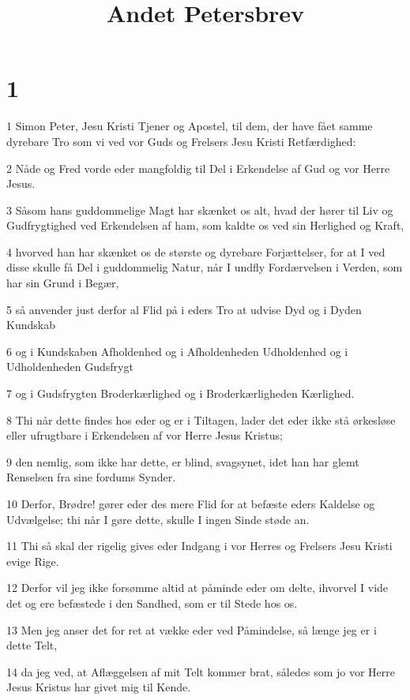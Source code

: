 

\title{Andet Petersbrev}


\chapter{1}

\par 1 Simon Peter, Jesu Kristi Tjener og Apostel, til dem, der have fået samme dyrebare Tro som vi ved vor Guds og Frelsers Jesu Kristi Retfærdighed:
\par 2 Nåde og Fred vorde eder mangfoldig til Del i Erkendelse af Gud og vor Herre Jesus.
\par 3 Såsom hans guddommelige Magt har skænket os alt, hvad der hører til Liv og Gudfrygtighed ved Erkendelsen af ham, som kaldte os ved sin Herlighed og Kraft,
\par 4 hvorved han har skænket os de største og dyrebare Forjættelser, for at I ved disse skulle få Del i guddommelig Natur, når I undfly Fordærvelsen i Verden, som har sin Grund i Begær,
\par 5 så anvender just derfor al Flid på i eders Tro at udvise Dyd og i Dyden Kundskab
\par 6 og i Kundskaben Afholdenhed og i Afholdenheden Udholdenhed og i Udholdenheden Gudsfrygt
\par 7 og i Gudsfrygten Broderkærlighed og i Broderkærligheden Kærlighed.
\par 8 Thi når dette findes hos eder og er i Tiltagen, lader det eder ikke stå ørkesløse eller ufrugtbare i Erkendelsen af vor Herre Jesus Kristus;
\par 9 den nemlig, som ikke har dette, er blind, svagsynet, idet han har glemt Renselsen fra sine fordums Synder.
\par 10 Derfor, Brødre! gører eder des mere Flid for at befæste eders Kaldelse og Udvælgelse; thi når I gøre dette, skulle I ingen Sinde støde an.
\par 11 Thi så skal der rigelig gives eder Indgang i vor Herres og Frelsers Jesu Kristi evige Rige.
\par 12 Derfor vil jeg ikke forsømme altid at påminde eder om delte, ihvorvel I vide det og ere befæstede i den Sandhed, som er til Stede hos os.
\par 13 Men jeg anser det for ret at vække eder ved Påmindelse, så længe jeg er i dette Telt,
\par 14 da jeg ved, at Aflæggelsen af mit Telt kommer brat, således som jo vor Herre Jesus Kristus har givet mig til Kende.
